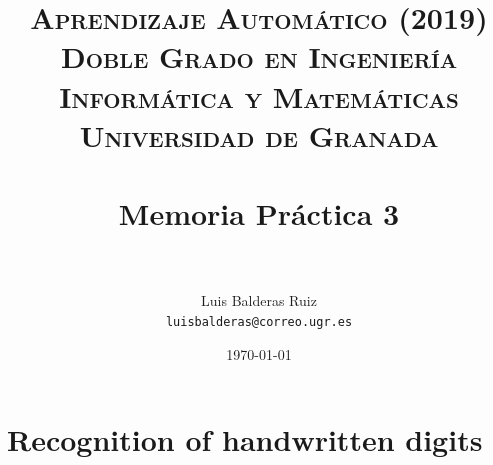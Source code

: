 
\graphicspath{ {./images/} }
\usepackage{subcaption}
\usepackage{hyperref}
\usepackage{soul}



\title{	
\normalfont \normalsize 
\textsc{\textbf{Aprendizaje Automático (2019)} \\ Doble Grado en Ingeniería Informática y Matemáticas \\ Universidad de Granada} \\ [25pt] %
\horrule{0.5pt} \\[0.4cm] %
\huge Memoria Práctica 3 \\ %
\horrule{2pt} \\[0.5cm] %
}

\author{Luis Balderas Ruiz \\ \texttt{luisbalderas@correo.ugr.es}} 


\date{\normalsize\today} %




\maketitle %

\newpage %

\tableofcontents %

\listoffigures

\listoftables

\newpage



\section{Recognition of handwritten digits}


